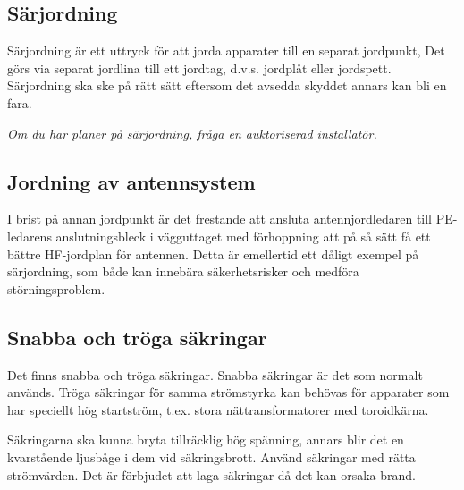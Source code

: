 \subsection{Särjordning}

Särjordning är ett uttryck för att jorda apparater till en separat
jordpunkt, Det görs via separat jordlina till ett jordtag,
d.v.s. jordplåt eller jordspett. Särjordning ska ske på rätt sätt
eftersom det avsedda skyddet annars kan bli en fara.

\emph{Om du har planer på särjordning, fråga en auktoriserad installatör.}

\subsection{Jordning av antennsystem}

I brist på annan jordpunkt är det frestande att ansluta
antennjordledaren till PE-ledarens anslutningsbleck i vägguttaget med
förhoppning att på så sätt få ett bättre HF-jordplan för
antennen. Detta är emellertid ett dåligt exempel på särjordning, som
både kan innebära säkerhetsrisker och medföra störningsproblem.

\subsection{Snabba och tröga säkringar}

Det finns snabba och tröga säkringar. Snabba säkringar är det som
normalt används. Tröga säkringar för samma strömstyrka kan behövas för
apparater som har speciellt hög startström, t.ex. stora
nättransformatorer med toroidkärna.

Säkringarna ska kunna bryta tillräcklig hög spänning, annars blir det
en kvarstående ljusbåge i dem vid säkringsbrott. Använd säkringar med rätta
strömvärden. Det är förbjudet att laga säkringar då det kan orsaka brand.
